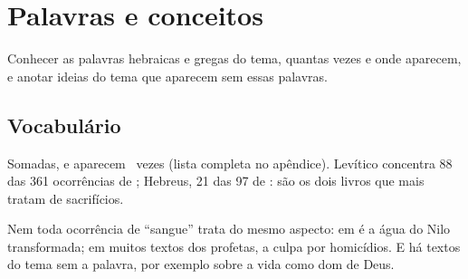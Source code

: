 \chapter{Palavras e conceitos}

\begin{objetivo}
Conhecer as palavras hebraicas e gregas do tema, quantas vezes e onde
aparecem, e anotar ideias do tema que aparecem sem essas palavras.
\end{objetivo}

\section{Vocabulário}
\vocabulariodotema

Somadas,  e  aparecem \temaNOcorrencias\ vezes (lista
completa no apêndice). Levítico concentra 88 das 361 ocorrências de ;
Hebreus, 21 das 97 de : são os dois livros que mais tratam de
sacrifícios.

\begin{alerta}
Nem toda ocorrência de \enquote{sangue} trata do mesmo aspecto: em
 é a água do Nilo transformada; em muitos textos dos profetas,
a culpa por homicídios. E há textos do tema sem a palavra, por exemplo sobre
a vida como dom de Deus.
\end{alerta}

